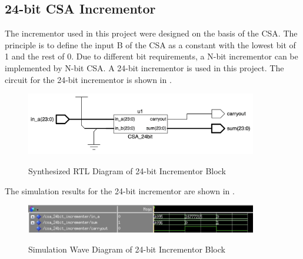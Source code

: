 \subsection{24-bit CSA Incrementor}

The incrementor used in this project were designed on the basis of the CSA.
The principle is to define the input B of the CSA as a constant with the lowest bit of 1 and the rest of 0.
Due to different bit requirements, a N-bit incrementor can be implemented by N-bit CSA.
A 24-bit incrementor is used in this project.
The circuit for the 24-bit incrementor is shown in .

\begin{figure}[!htp]
	\centering
	\caption{Synthesized RTL Diagram of 24-bit Incrementor Block}
	\includegraphics[width=0.9\textwidth]{../img/24_incre_rtl.png}
	\label{fig:24_incre_rtl}
\end{figure}

The simulation results for the 24-bit incrementor are shown in .

\begin{figure}[!htp]
	\centering
	\caption{Simulation Wave Diagram of 24-bit Incrementor Block}
	\includegraphics[width=0.9\textwidth]{../img/24_incre_sim.png}
	\label{fig:24_incre_sim}
\end{figure}